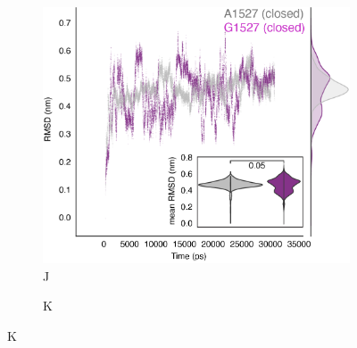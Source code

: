 \begin{figure}[H]
\begin{subfigure}[t]{0.165\textwidth}
    \end{subfigure}
    \hspace{0.01\textwidth} %
    \begin{subfigure}[t]{0.32\textwidth}
        \caption{J}
        \includegraphics[width=\textwidth]{./main_plots/variant_dynamics.png}        
    \end{subfigure}
    \begin{subfigure}[t]{0.16\textwidth}
        \caption{K}

\end{subfigure}
\end{figure}
